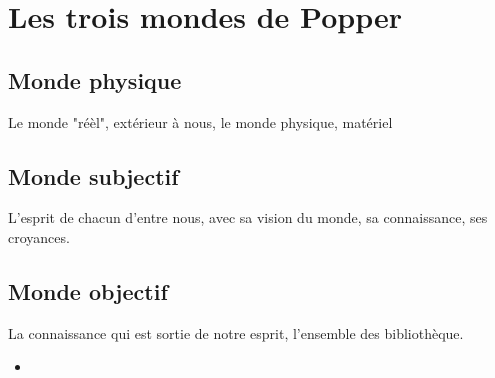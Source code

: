 

\section{Les trois mondes de Popper}

  \subsection{Monde physique}
Le monde "réèl", extérieur à nous, le monde physique, matériel

  \subsection{Monde subjectif}
L'esprit de chacun d'entre nous, avec sa vision du monde, sa connaissance, ses croyances.

  \subsection{Monde objectif}
La connaissance qui est sortie de notre esprit, l'ensemble des bibliothèque.

	\begin{itemize}[leftmargin=1cm, label=, itemsep=1pt]
		\item 
	\end{itemize}



